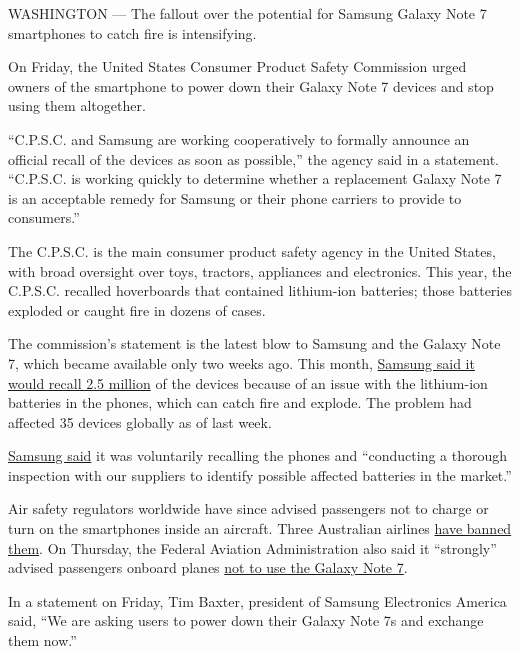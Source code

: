 WASHINGTON --- The fallout over the potential for Samsung Galaxy Note 7
smartphones to catch fire is intensifying.

On Friday, the United States Consumer Product Safety Commission urged
owners of the smartphone to power down their Galaxy Note 7 devices and
stop using them altogether.

``C.P.S.C. and Samsung are working cooperatively to formally announce an
official recall of the devices as soon as possible,'' the agency said in
a statement. ``C.P.S.C. is working quickly to determine whether a
replacement Galaxy Note 7 is an acceptable remedy for Samsung or their
phone carriers to provide to consumers.''

The C.P.S.C. is the main consumer product safety agency in the United
States, with broad oversight over toys, tractors, appliances and
electronics. This year, the C.P.S.C. recalled hoverboards that contained
lithium-ion batteries; those batteries exploded or caught fire in dozens
of cases.

The commission's statement is the latest blow to Samsung and the Galaxy
Note 7, which became available only two weeks ago. This month,
\href{http://www.nytimes3xbfgragh.onion/2016/09/03/business/samsung-galaxy-note-battery.html}{Samsung
said it would recall 2.5 million} of the devices because of an issue
with the lithium-ion batteries in the phones, which can catch fire and
explode. The problem had affected 35 devices globally as of last week.

\href{https://news.samsung.com/global/statement-on-galaxy-note7}{Samsung
said} it was voluntarily recalling the phones and ``conducting a
thorough inspection with our suppliers to identify possible affected
batteries in the market.''

Air safety regulators worldwide have since advised passengers not to
charge or turn on the smartphones inside an aircraft. Three Australian
airlines
\href{http://www.nytimes3xbfgragh.onion/reuters/2016/09/08/technology/08reuters-airlines-samsung.html}{have
banned them}. On Thursday, the Federal Aviation Administration also said
it ``strongly'' advised passengers onboard planes
\href{http://www.nytimes3xbfgragh.onion/2016/09/09/business/faa-strongly-advises-against-using-samsung-galaxy-note-7-on-planes.html}{not
to use the Galaxy Note 7}.

In a statement on Friday, Tim Baxter, president of Samsung Electronics
America said, ``We are asking users to power down their Galaxy Note 7s
and exchange them now.''

